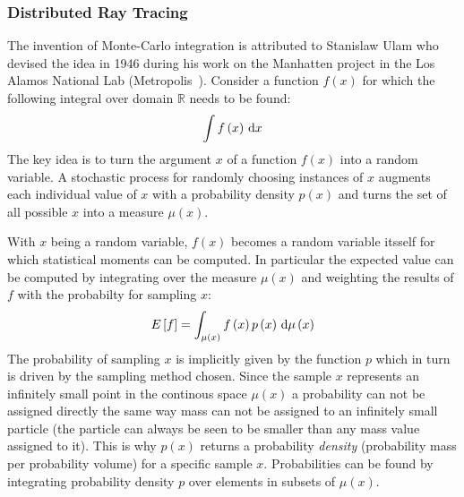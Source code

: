 \subsubsection*{Distributed Ray Tracing}

The invention of Monte-Carlo integration is attributed to Stanislaw Ulam who devised the idea in 1946 during his work on the Manhatten project in the Los Alamos National Lab (Metropolis~\cite{Metropolis49, Metropolis87}). Consider a function $f\left(x\right)$ for which the following integral over domain $\mathbb{R}$ needs to be found:
\begin{align}
\int f\left(x\right)\,\mathrm{d} x
\label{eq:mc_integral_1}
\end{align}
The key idea is to turn the argument $x$ of a function $f(x)$ into a random variable. A stochastic process for randomly choosing instances of $x$ augments each individual value of $x$ with a probability density $p(x)$ and turns the set of all possible $x$ into a measure $\mu(x)$.

With $x$ being a random variable, $f\left(x\right)$ becomes a random variable itsself for which statistical moments can be computed. In particular the expected value can be computed by integrating over the measure $\mu(x)$ and weighting the results of $f$ with the probabilty for sampling $x$:
\begin{align}
E\left[f\right] = \int_{\mu\left(x\right)} f\left(x\right)p\left(x\right)\,\mathrm{d}\mu\left(x\right)
\end{align}
The probability of sampling $x$ is implicitly given by the function $p$ which in turn is driven by the sampling method chosen. Since the sample $x$ represents an infinitely small point in the continous space $\mu\left(x\right)$ a probability can not be assigned directly the same way mass can not be assigned to an infinitely small particle (the particle can always be seen to be smaller than any mass value assigned to it). This is why $p(x)$ returns a probability \emph{density} (probability mass per probability volume) for a specific sample $x$. Probabilities can be found by integrating probability density $p$ over elements in subsets of $\mu\left(x\right)$.


